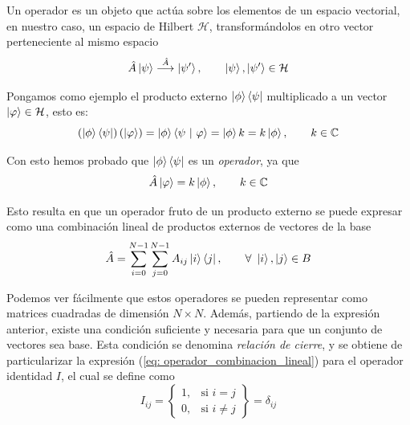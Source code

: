 \documentclass{article}
\numberwithin{equation}{section} %
\begin{document}
    \vspace{5mm}

    Un operador es un objeto que actúa sobre los elementos de un espacio vectorial, en nuestro caso, un espacio de Hilbert \( \mathcal{H} \), transformándolos en otro vector perteneciente al mismo espacio
    \begin{equation}
        \hat{A} \ket{\psi} \overset{\hat{A}}{\longrightarrow} \ket{\psi '}, \qquad \ket{\psi}, \ket{\psi '} \in \mathcal{H}
        \label{eq: operador_espacio_hilbert}
    \end{equation}

    \vspace{1.5mm}

    Pongamos como ejemplo el producto externo \( \ket{\phi} \bra{\psi} \) multiplicado a un vector \( \ket{\varphi} \in \mathcal{H} \), esto es:
    \begin{equation*}
        \left( \ket{\phi} \bra{\psi} \right) \left( \ket{\varphi} \right) = \ket{\phi} \braket{\psi \ | \ \varphi} = \ket{\phi} k = k \ket{\phi}, \qquad k \in \mathbb{C}
    \end{equation*}

    \vspace{1.5mm}

    Con esto hemos probado que \( \ket{\phi} \bra{\psi} \) es un \textit{operador}, ya que 
    \begin{equation}
        \hat{A} \ket\varphi = k \ket{\phi}, \qquad k \in \mathbb{C}
    \end{equation}

    \vspace{1.5mm}

    Esto resulta en que un operador fruto de un producto externo se puede expresar como una combinación lineal de productos externos de vectores de la base
    \begin{equation}
        \hat{A} = \sum_{i = 0}^{N - 1} \sum_{j = 0}^{N - 1} A_{ij} \ket{i} \bra{j}, \qquad \forall \ \ket{i}, \ket{j} \in B
        \label{eq: operador_combinacion_lineal}
    \end{equation}

    \vspace{1.5mm}

    Podemos ver fácilmente que estos operadores se pueden representar como matrices cuadradas de dimensión \( N \times N \). Además, partiendo de la expresión anterior, existe una condición suficiente y necesaria para que un conjunto de vectores sea base. Esta condición se denomina \textit{relación de cierre}, y se obtiene de particularizar la expresión (\ref{eq: operador_combinacion_lineal}) para el operador identidad \( I \), el cual se define como 
    \begin{equation}
        I_{ij} =
        \left\{
        \begin{array}{ll}
            1, & \text{si } i = j \\
            0, & \text{si } i \neq j
        \end{array}
        \right\}
        = \delta_{ij}
    \end{equation}
\end{document}
